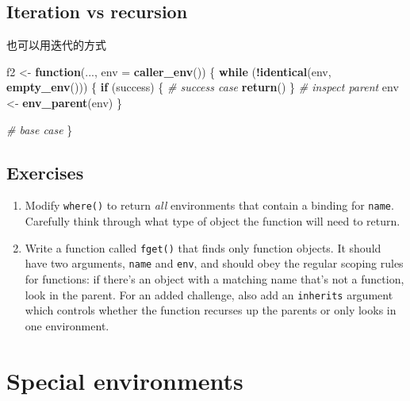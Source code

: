 \documentclass[]{book}
\newenvironment{Shaded}{\begin{snugshade}}{\end{snugshade}}
\newcommand{\CommentTok}[1]{\textcolor[rgb]{0.56,0.35,0.01}{\textit{#1}}}
\newcommand{\ControlFlowTok}[1]{\textcolor[rgb]{0.13,0.29,0.53}{\textbf{#1}}}
\newcommand{\DataTypeTok}[1]{\textcolor[rgb]{0.13,0.29,0.53}{#1}}
\newcommand{\KeywordTok}[1]{\textcolor[rgb]{0.13,0.29,0.53}{\textbf{#1}}}
\newcommand{\NormalTok}[1]{#1}
\newcommand{\OperatorTok}[1]{\textcolor[rgb]{0.81,0.36,0.00}{\textbf{#1}}}
\newcommand{\StringTok}[1]{\textcolor[rgb]{0.31,0.60,0.02}{#1}}
\theoremstyle{definition}
\theoremstyle{definition}
\theoremstyle{definition}
\theoremstyle{remark}
\begin{document}
\hypertarget{iteration-vs-recursion}{%
\subsection*{Iteration vs recursion}\label{iteration-vs-recursion}}

也可以用迭代的方式

\begin{Shaded}
\begin{Highlighting}[]
\NormalTok{f2 <-}\StringTok{ }\ControlFlowTok{function}\NormalTok{(..., }\DataTypeTok{env =} \KeywordTok{caller_env}\NormalTok{()) \{}
  \ControlFlowTok{while}\NormalTok{ (}\OperatorTok{!}\KeywordTok{identical}\NormalTok{(env, }\KeywordTok{empty_env}\NormalTok{())) \{}
    \ControlFlowTok{if}\NormalTok{ (success) \{}
      \CommentTok{# success case}
      \KeywordTok{return}\NormalTok{()}
\NormalTok{    \}}
    \CommentTok{# inspect parent}
\NormalTok{    env <-}\StringTok{ }\KeywordTok{env_parent}\NormalTok{(env)}
\NormalTok{  \}}

  \CommentTok{# base case}
\NormalTok{\}}
\end{Highlighting}
\end{Shaded}

\hypertarget{exercises-7}{%
\subsection{Exercises}\label{exercises-7}}

\begin{enumerate}
\def\labelenumi{\arabic{enumi}.}
\item
  Modify \texttt{where()} to return \emph{all} environments that contain
  a binding for \texttt{name}. Carefully think through what type of
  object the function will need to return.
\item
  Write a function called \texttt{fget()} that finds only function
  objects. It should have two arguments, \texttt{name} and \texttt{env},
  and should obey the regular scoping rules for functions: if there's an
  object with a matching name that's not a function, look in the parent.
  For an added challenge, also add an \texttt{inherits} argument which
  controls whether the function recurses up the parents or only looks in
  one environment.
\end{enumerate}

\hypertarget{function-envs}{%
\section{Special environments}\label{function-envs}}
\end{document}

